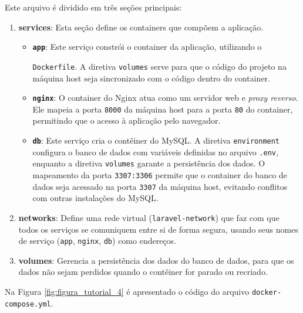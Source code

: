             \par Este arquivo é dividido em três seções principais:
    
            \begin{enumerate}
                \item \textbf{services}: Esta seção define os containers que compõem a aplicação.
                \begin{itemize}
                    \item \textbf{\texttt{app}}: Este serviço constrói o container da aplicação, utilizando o 
                    
                    \texttt{Dockerfile}. A diretiva \texttt{volumes} serve para que o código do projeto na máquina host seja sincronizado com o código dentro do container.
                    
                    \item \textbf{\texttt{nginx}}: O container do Nginx atua como um servidor web e \textit{proxy reverso}. Ele mapeia a porta \texttt{8000} da máquina host para a porta \texttt{80} do container, permitindo que o acesso à aplicação pelo navegador.
                    
                    \item \textbf{\texttt{db}}: Este serviço cria o contêiner do MySQL. A diretiva \texttt{environment} configura o banco de dados com variáveis definidas no arquivo \texttt{.env}, enquanto a diretiva \texttt{volumes} garante a persistência dos dados. O mapeamento da porta \texttt{3307:3306} permite que o container do banco de dados seja acessado na porta \texttt{3307} da máquina host, evitando conflitos com outras instalações do MySQL.
                \end{itemize}
            
                \item \textbf{networks}: Define uma rede virtual (\texttt{laravel-network}) que faz com que todos os serviços se comuniquem entre si de forma segura, usando seus nomes de serviço (\texttt{app}, \texttt{nginx}, \texttt{db}) como endereços.
            
                \item \textbf{volumes}: Gerencia a persistência dos dados do banco de dados, para que os dados não sejam perdidos quando o contêiner for parado ou recriado.
            \end{enumerate}
        
            \par Na Figura \ref{fig:figura_tutorial_4} é apresentado o código do arquivo \texttt{docker-compose.yml}.
    
